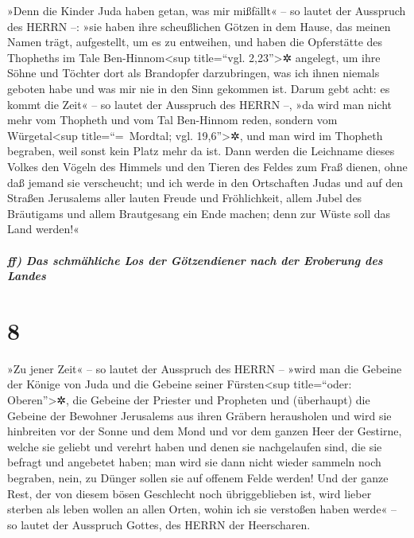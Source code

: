 »Denn die Kinder Juda haben getan, was mir mißfällt« --
so lautet der Ausspruch des HERRN --: »sie haben ihre scheußlichen
Götzen in dem Hause, das meinen Namen trägt, aufgestellt, um es zu
entweihen, und haben die Opferstätte des Thopheths im
Tale Ben-Hinnom\textless sup title=``vgl. 2,23''\textgreater✲ angelegt,
um ihre Söhne und Töchter dort als Brandopfer darzubringen, was ich
ihnen niemals geboten habe und was mir nie in den Sinn gekommen ist.
Darum gebt acht: es kommt die Zeit« -- so lautet der
Ausspruch des HERRN --, »da wird man nicht mehr vom Thopheth und vom Tal
Ben-Hinnom reden, sondern vom Würgetal\textless sup title=``=~Mordtal;
vgl. 19,6''\textgreater✲, und man wird im Thopheth begraben, weil sonst
kein Platz mehr da ist. Dann werden die Leichname dieses
Volkes den Vögeln des Himmels und den Tieren des Feldes zum Fraß dienen,
ohne daß jemand sie verscheucht; und ich werde in den
Ortschaften Judas und auf den Straßen Jerusalems aller lauten Freude und
Fröhlichkeit, allem Jubel des Bräutigams und allem Brautgesang ein Ende
machen; denn zur Wüste soll das Land werden!«

\hypertarget{ff-das-schmuxe4hliche-los-der-guxf6tzendiener-nach-der-eroberung-des-landes}{%
\subparagraph{ff) Das schmähliche Los der Götzendiener nach der
Eroberung des
Landes}\label{ff-das-schmuxe4hliche-los-der-guxf6tzendiener-nach-der-eroberung-des-landes}}

\hypertarget{section-7}{%
\section{8}\label{section-7}}

»Zu jener Zeit« -- so lautet der Ausspruch des HERRN --
»wird man die Gebeine der Könige von Juda und die Gebeine seiner
Fürsten\textless sup title=``oder: Oberen''\textgreater✲, die Gebeine
der Priester und Propheten und (überhaupt) die Gebeine der Bewohner
Jerusalems aus ihren Gräbern herausholen und wird sie
hinbreiten vor der Sonne und dem Mond und vor dem ganzen Heer der
Gestirne, welche sie geliebt und verehrt haben und denen sie
nachgelaufen sind, die sie befragt und angebetet haben; man wird sie
dann nicht wieder sammeln noch begraben, nein, zu Dünger sollen sie auf
offenem Felde werden! Und der ganze Rest, der von diesem
bösen Geschlecht noch übriggeblieben ist, wird lieber sterben als leben
wollen an allen Orten, wohin ich sie verstoßen haben werde« -- so lautet
der Ausspruch Gottes, des HERRN der Heerscharen.

